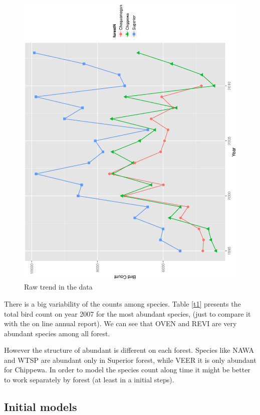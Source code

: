 \documentclass{article}
\begin{document}
\begin{figure}[h!]
\centering
\includegraphics[scale=.4, angle=-90]{rawtrend.ps}
\caption{Raw trend in the data \label{figtr} }
\end{figure}

There is a big variability of the counts among species. Table \ref{t1} presents the total bird count on year 2007 for the most abundant species, (just to compare it with the on line annual report). We can see that OVEN and REVI are very abundant species among all forest. 

However the structure of abundant is different on each forest. Species like NAWA and WTSP are abundant only in Superior forest, while VEER it is only abundant for Chippewa. In order to model the species count along time it might be better to work separately by forest (at least in a initial steps).  



\subsection{Initial models} 
\end{document}

